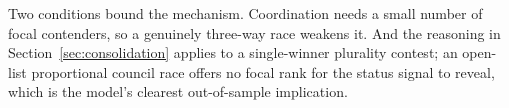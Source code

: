 \documentclass[11pt]{article}
\theoremstyle{definition}
\theoremstyle{remark}
\begin{document}
Two conditions bound the mechanism. Coordination needs a small number of
focal contenders, so a genuinely three-way race weakens it. And the reasoning
in Section~\ref{sec:consolidation} applies to a single-winner plurality
contest; an open-list proportional council race offers no focal rank for the
status signal to reveal, which is the model's clearest out-of-sample
implication.



\end{document}
